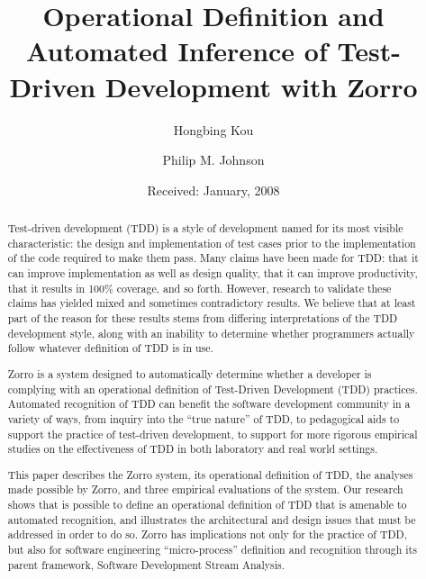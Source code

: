 \documentclass[smallextended]{svjour3}     %
\begin{document}
\title{Operational Definition and Automated Inference of Test-Driven Development with Zorro}
\author{Hongbing Kou \and Philip M. Johnson}

\date{Received: January, 2008}

\maketitle

\begin{abstract}

Test-driven development (TDD) is a style of development named for its most
visible characteristic: the design and implementation of test cases prior
to the implementation of the code required to make them pass. Many claims
have been made for TDD: that it can improve implementation as well as
design quality, that it can improve productivity, that it results in 100\%
coverage, and so forth.  However, research to validate these claims has
yielded mixed and sometimes contradictory results.  We believe that at
least part of the reason for these results stems from differing
interpretations of the TDD development style, along with an inability to
determine whether programmers actually follow whatever definition of
TDD is in use.

Zorro is a system designed to automatically determine whether a developer
is complying with an operational definition of Test-Driven Development
(TDD) practices.  Automated recognition of TDD can benefit the software
development community in a variety of ways, from inquiry into the ``true
nature'' of TDD, to pedagogical aids to support the practice of test-driven
development, to support for more rigorous empirical studies on the
effectiveness of TDD in both laboratory and real world settings.

This paper describes the Zorro system, its operational definition of TDD,
the analyses made possible by Zorro, and three empirical evaluations of the
system.  Our research shows that is possible to define an operational
definition of TDD that is amenable to automated recognition, and
illustrates the architectural and design issues that must be addressed in
order to do so.  Zorro has implications not only for the practice of TDD,
but also for software engineering ``micro-process'' definition and
recognition through its parent framework, Software Development Stream
Analysis.



\end{abstract}
\end{document}

